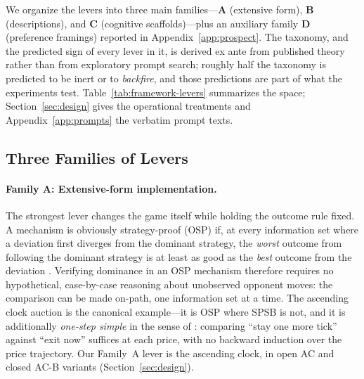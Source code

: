 We organize the levers into three main families---\textbf{A} (extensive form),
\textbf{B} (descriptions), and \textbf{C} (cognitive scaffolds)---plus an
auxiliary family \textbf{D} (preference framings) reported in
Appendix~\ref{app:prospect}. The taxonomy, and the predicted sign of every
lever in it, is derived ex ante from published theory rather than from
exploratory prompt search; roughly half the taxonomy is predicted to be inert
or to \emph{backfire}, and those predictions are part of what the experiments
test. Table~\ref{tab:framework-levers} summarizes the space;
Section~\ref{sec:design} gives the operational treatments and
Appendix~\ref{app:prompts} the verbatim prompt texts.

\subsection{Three Families of Levers}\label{sec:framework-families}

\paragraph{Family A: Extensive-form implementation.}
The strongest lever changes the game itself while holding the outcome rule
fixed. A mechanism is obviously strategy-proof (OSP) if, at every information
set where a deviation first diverges from the dominant strategy, the
\emph{worst} outcome from following the dominant strategy is at least as good
as the \emph{best} outcome from the deviation \citep{li2017obviously}.
Verifying dominance in an OSP mechanism therefore requires no hypothetical,
case-by-case reasoning about unobserved opponent moves: the comparison can be
made on-path, one information set at a time. The ascending clock auction is the
canonical example---it is OSP where SPSB is not, and it is additionally
\emph{one-step simple} in the sense of \citet{pycia2023theory}: comparing
``stay one more tick'' against ``exit now'' suffices at each price, with no
backward induction over the price trajectory. Our Family~A lever is the
ascending clock, in open AC and closed AC-B variants (Section~\ref{sec:design}).

